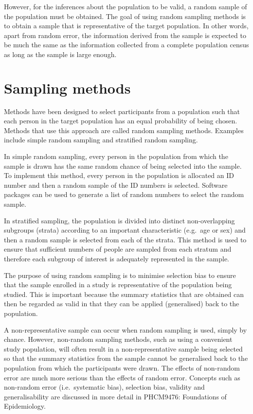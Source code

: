 \documentclass[
]{memoir}
\begin{document}
However, for the inferences about the population to be valid, a random sample of the population must be obtained. The goal of using random sampling methods is to obtain a sample that is representative of the target population. In other words, apart from random error, the information derived from the sample is expected to be much the same as the information collected from a complete population census as long as the sample is large enough.

\hypertarget{sampling-methods}{%
\section{Sampling methods}\label{sampling-methods}}

Methods have been designed to select participants from a population such that each person in the target population has an equal probability of being chosen. Methods that use this approach are called random sampling methods. Examples include simple random sampling and stratified random sampling.

In simple random sampling, every person in the population from which the sample is drawn has the same random chance of being selected into the sample. To implement this method, every person in the population is allocated an ID number and then a random sample of the ID numbers is selected. Software packages can be used to generate a list of random numbers to select the random sample.

In stratified sampling, the population is divided into distinct non-overlapping subgroups (strata) according to an important characteristic (e.g.~age or sex) and then a random sample is selected from each of the strata. This method is used to ensure that sufficient numbers of people are sampled from each stratum and therefore each subgroup of interest is adequately represented in the sample.

The purpose of using random sampling is to minimise selection bias to ensure that the sample enrolled in a study is representative of the population being studied. This is important because the summary statistics that are obtained can then be regarded as valid in that they can be applied (generalised) back to the population.

A non-representative sample can occur when random sampling is used, simply by chance. However, non-random sampling methods, such as using a convenient study population, will often result in a non-representative sample being selected so that the summary statistics from the sample cannot be generalised back to the population from which the participants were drawn. The effects of non-random error are much more serious than the effects of random error. Concepts such as non-random error (i.e.~systematic bias), selection bias, validity and generalisability are discussed in more detail in PHCM9476: Foundations of Epidemiology.
\end{document}
